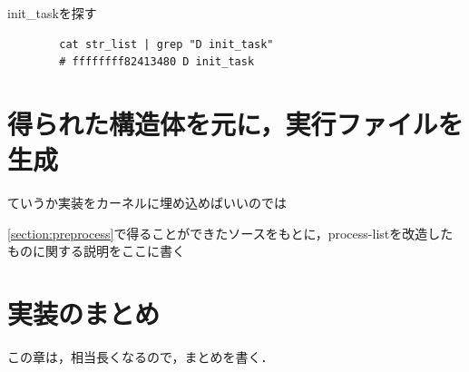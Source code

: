 \begin{itembox}[l]{init_taskを探す}
    \begin{verbatim}
        cat str_list | grep "D init_task"
        # ffffffff82413480 D init_task
    \end{verbatim}
\end{itembox}

\section{得られた構造体を元に，実行ファイルを生成}

ていうか実装をカーネルに埋め込めばいいのでは

\ref{section:preprocess}で得ることができたソースをもとに，process-listを改造したものに関する説明をここに書く

\section{実装のまとめ}

この章は，相当長くなるので，まとめを書く．
